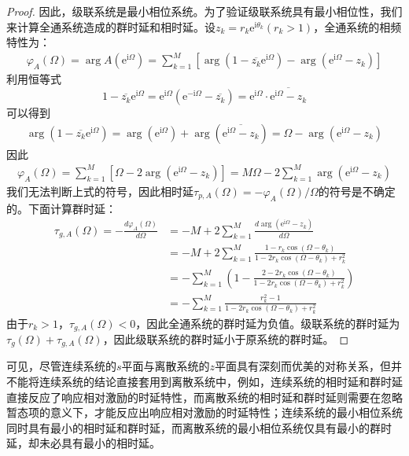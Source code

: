 \begin{proof}
    因此，级联系统是最小相位系统。为了验证级联系统具有最小相位性，我们来计算全通系统造成的群时延和相时延。设$z_k=r_k \mathrm{e}^{\mathrm{i}\theta_k}(r_k>1)$，全通系统的相频特性为：
    \begin{align*}
        \varphi_A(\Omega)=\arg A(\mathrm{e}^{\mathrm{i}\Omega})=\sum_{k=1}^{M}\left[\arg(1-\overline{z_k}\mathrm{e}^{\mathrm{i}\Omega})-\arg(\mathrm{e}^{\mathrm{i}\Omega}-z_k)\right]
    \end{align*}
    利用恒等式
    $$1-\overline{z_k} \mathrm{e}^{\mathrm{i}\Omega}=\mathrm{e}^{\mathrm{i}\Omega}(\mathrm{e}^{-\mathrm{i}\Omega}-\overline{z_k})=\mathrm{e}^{\mathrm{i}\Omega}\cdot\overline{\mathrm{e}^{\mathrm{i}\Omega}-z_k}$$
    可以得到
    \begin{align*}
        \arg(1-\overline{z_k}\mathrm{e}^{\mathrm{i}\Omega})=\arg(\mathrm{e}^{\mathrm{i}\Omega})+\arg(\overline{\mathrm{e}^{\mathrm{i}\Omega}-z_k})=\Omega-\arg(\mathrm{e}^{\mathrm{i}\Omega}-z_k)
    \end{align*}
    因此\begin{align*}
        \varphi_A(\Omega)=\sum_{k=1}^{M}\left[\Omega-2\arg(\mathrm{e}^{\mathrm{i}\Omega}-z_k)\right]=M\Omega-2\sum_{k=1}^{M}\arg(\mathrm{e}^{\mathrm{i}\Omega}-z_k)
    \end{align*}
    我们无法判断上式的符号，因此相时延$\tau_{p,A}(\Omega)=-\varphi_A(\Omega)/\Omega$的符号是不确定的。下面计算群时延：
    \begin{align*}
        \tau_{g,A}(\Omega)=-\frac{d\varphi_A(\Omega)}{d\Omega}&=-M+2\sum_{k=1}^{M}\frac{d\arg(\mathrm{e}^{\mathrm{i}\Omega}-z_k)}{d\Omega}\\
        &=-M+2\sum_{k=1}^{M}\frac{1-r_k\cos(\Omega-\theta_k)}{1-2r_k\cos(\Omega-\theta_k)+r_k^2}\\
        &=-\sum_{k=1}^{M}\left(1-\frac{2-2r_k\cos(\Omega-\theta_k)}{1-2r_k\cos(\Omega-\theta_k)+r_k^2}\right)\\
        &=-\sum_{k=1}^{M}\frac{r_k^2-1}{1-2r_k\cos(\Omega-\theta_k)+r_k^2}
    \end{align*}
    由于$r_k>1$，$\tau_{g,A}(\Omega)<0$，因此全通系统的群时延为负值。级联系统的群时延为$\tau_g(\Omega)+\tau_{g,A}(\Omega)$，因此级联系统的群时延小于原系统的群时延。
\end{proof}

可见，尽管连续系统的$s$平面与离散系统的$z$平面具有深刻而优美的对称关系，但并不能将连续系统的结论直接套用到离散系统中，例如，连续系统的相时延和群时延直接反应了响应相对激励的时延特性，而离散系统的相时延和群时延则需要在忽略暂态项的意义下，才能反应出响应相对激励的时延特性；连续系统的最小相位系统同时具有最小的相时延和群时延，而离散系统的最小相位系统仅具有最小的群时延，却未必具有最小的相时延。
